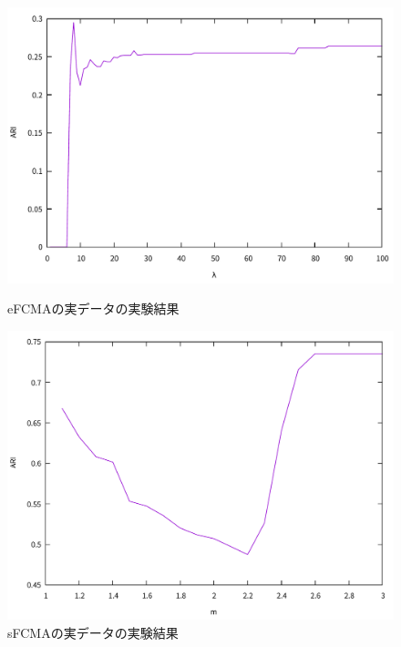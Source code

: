 \documentclass[twocolumn, a4paper]{icethesisabst}
\begin{document}
\begin{figure}[htbp]
 \centering
 \begin{minipage}{0.43\hsize}
  \includegraphics[width=\linewidth]{eFCMA_ARI.pdf}
  \caption{eFCMAの実データの実験結果}
  \label{fig:eFCMA_ARI}
 \end{minipage}
 \begin{minipage}{0.43\hsize}
  \includegraphics[width=\linewidth]{sFCMA_ARI.pdf}
  \caption{sFCMAの実データの実験結果}
  \label{fig:sFCMA_ARI}
 \end{minipage}
\end{figure}
\end{document}

